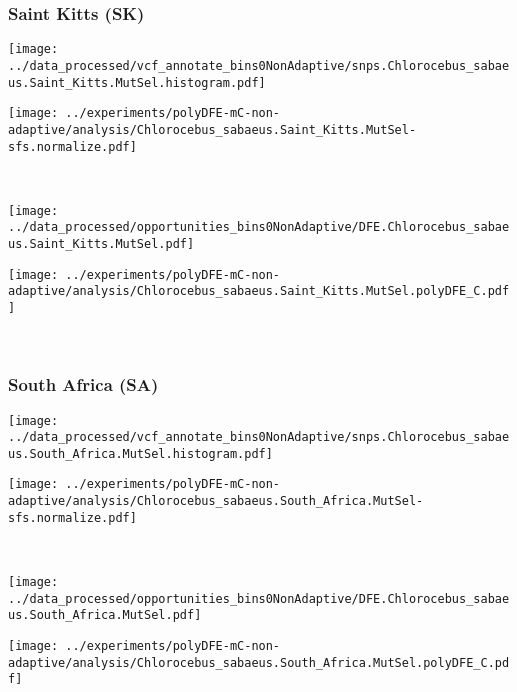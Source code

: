 \subsubsection{Saint Kitts (SK)}

\begin{minipage}{0.49\linewidth}
    \texttt{[image: ../data\_processed/vcf\_annotate\_bins0NonAdaptive/snps.Chlorocebus\_sabaeus.Saint\_Kitts.MutSel.histogram.pdf]}
\end{minipage}
\begin{minipage}{0.49\linewidth}
    \texttt{[image: ../experiments/polyDFE-mC-non-adaptive/analysis/Chlorocebus\_sabaeus.Saint\_Kitts.MutSel-sfs.normalize.pdf]}
\end{minipage}
\\
\begin{minipage}{0.49\linewidth}
    \texttt{[image: ../data\_processed/opportunities\_bins0NonAdaptive/DFE.Chlorocebus\_sabaeus.Saint\_Kitts.MutSel.pdf]}
\end{minipage}
\begin{minipage}{0.49\linewidth}
    \texttt{[image: ../experiments/polyDFE-mC-non-adaptive/analysis/Chlorocebus\_sabaeus.Saint\_Kitts.MutSel.polyDFE\_C.pdf]}
\end{minipage}
\\

\subsubsection{South Africa (SA)}

\begin{minipage}{0.49\linewidth}
    \texttt{[image: ../data\_processed/vcf\_annotate\_bins0NonAdaptive/snps.Chlorocebus\_sabaeus.South\_Africa.MutSel.histogram.pdf]}
\end{minipage}
\begin{minipage}{0.49\linewidth}
    \texttt{[image: ../experiments/polyDFE-mC-non-adaptive/analysis/Chlorocebus\_sabaeus.South\_Africa.MutSel-sfs.normalize.pdf]}
\end{minipage}
\\
\begin{minipage}{0.49\linewidth}
    \texttt{[image: ../data\_processed/opportunities\_bins0NonAdaptive/DFE.Chlorocebus\_sabaeus.South\_Africa.MutSel.pdf]}
\end{minipage}
\begin{minipage}{0.49\linewidth}
    \texttt{[image: ../experiments/polyDFE-mC-non-adaptive/analysis/Chlorocebus\_sabaeus.South\_Africa.MutSel.polyDFE\_C.pdf]}
\end{minipage}
\\

